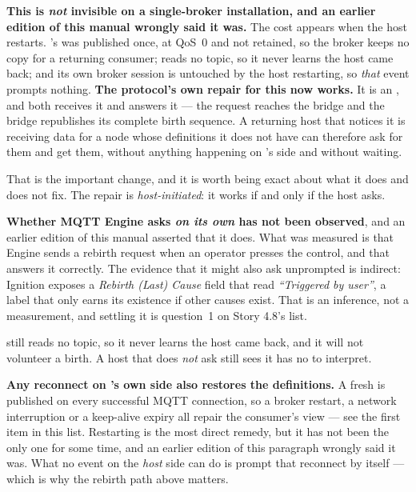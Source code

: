 \begin{itemize}
        \textbf{This is \emph{not} invisible on a single-broker installation, and an
        earlier edition of this manual wrongly said it was.} The cost appears when the
        host restarts. \prog's  was published once, at QoS~0 and not
        retained, so the broker keeps no copy for a returning consumer; \prog reads no
         topic, so it never learns the host came back; and its own broker
        session is untouched by the host restarting, so \emph{that} event prompts nothing.
        \textbf{The protocol's own repair for this now works.} It is an 
        , and \prog both receives it and answers it --- the
        request reaches the bridge and the bridge republishes its complete birth sequence.
        A returning host that notices it is receiving data for a node whose definitions it
        does not have can therefore ask for them and get them, without anything happening
        on \prog's side and without waiting.

        That is the important change, and it is worth being exact about what it does and
        does not fix. The repair is \emph{host-initiated}: it works if and only if the host
        asks.

        \textbf{Whether MQTT Engine asks \emph{on its own} has not been observed}, and an
        earlier edition of this manual asserted that it does. What was measured is that
        Engine sends a rebirth request when an operator presses the control, and that
        \prog answers it correctly. The evidence that it might also ask unprompted is
        indirect: Ignition exposes a \emph{Rebirth (Last) Cause} field that read
        \emph{``Triggered by user''}, a label that only earns its existence if other causes
        exist. That is an inference, not a measurement, and settling it is question~1 on
        Story 4.8's list.

        \prog still reads no  topic, so it never learns the host came back, and
        it will not volunteer a birth. A host that does \emph{not} ask still sees
         it has no  to interpret.

        \textbf{Any reconnect on \prog's own side also restores the definitions.} A fresh
         is published on every successful MQTT connection, so a broker
        restart, a network interruption or a keep-alive expiry all repair the consumer's
        view --- see the first item in this list. Restarting \prog is the most direct
        remedy, but it has not been the only one for some time, and an earlier edition of
        this paragraph wrongly said it was. What no event on the \emph{host} side can do is
        prompt that reconnect by itself --- which is why the rebirth path above matters.


\end{itemize}
